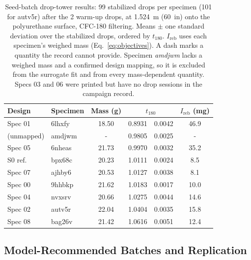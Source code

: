 \documentclass[11pt]{article}
\begin{document}
\begin{table}[!tbp]
  \centering
  \caption{Seed-batch drop-tower results: 99 stabilized drops per
    specimen (101 for autv5r) after the 2 warm-up drops, at \SI{1.524}{m} (\SI{60}{in})
    onto the polyurethane surface, CFC-180 filtering. Means $\pm$ one
    standard deviation over the stabilized drops, ordered by $t_{180}$.
    $I_{\mathrm{reb}}$ uses each specimen's weighed mass
    (Eq.~\eqref{eq:objectives}). A dash marks a quantity the record
    cannot provide. Specimen \textit{amdjwm} lacks a weighed mass and a
    confirmed design mapping, so it is excluded from the surrogate fit
    and from every mass-dependent quantity. Specs 03 and 06 were printed
    but have no drop sessions in the campaign record.}
  \label{tab:seed-results}
  \small
  \begin{tabular}{@{}llS[table-format=2.2]S[table-format=1.4]@{\,$\pm$\,}S[table-format=1.4]S[table-format=2.1]@{}}
    \toprule
    Design & Specimen & {Mass (g)} &  &
    {$I_{\mathrm{reb}}$ (mg)} \\
    \midrule
    Spec 01 & 6lhxfy & 18.50 & 0.8931 & 0.0042 & 46.9 \\
    (unmapped) & amdjwm & {-} & 0.9805 & 0.0025 & {-} \\
    Spec 05 & 6nheas & 21.73 & 0.9970 & 0.0032 & 35.2 \\
    S0 ref. & bpx68c & 20.23 & 1.0111 & 0.0024 & 8.5 \\
    Spec 07 & ajhby6 & 20.53 & 1.0127 & 0.0038 & 8.1 \\
    Spec 00 & 9hhbkp & 21.62 & 1.0183 & 0.0017 & 10.0 \\
    Spec 04 & nvxsrv & 20.66 & 1.0275 & 0.0044 & 14.6 \\
    Spec 02 & autv5r & 22.04 & 1.0404 & 0.0035 & 15.8 \\
    Spec 08 & bag26v & 21.42 & 1.0616 & 0.0051 & 12.4 \\
    \bottomrule
  \end{tabular}
\end{table}

\subsection{Model-Recommended Batches and Replication}
\label{sec:results:batches}
\end{document}
